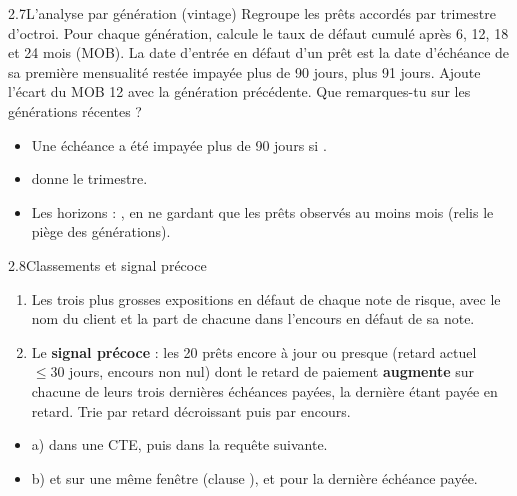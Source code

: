 \begin{exercice}{2.7}{L'analyse par génération (vintage)}
Regroupe les prêts accordés par trimestre d'octroi. Pour chaque génération, calcule le taux de défaut
cumulé après 6, 12, 18 et 24 mois (MOB). La date d'entrée en défaut d'un prêt est la date d'échéance de
sa première mensualité restée impayée plus de 90 jours, plus 91 jours. Ajoute l'écart du MOB 12 avec
la génération précédente. Que remarques-tu sur les générations récentes ?
\end{exercice}

\begin{indice}
\begin{itemize}
\item Une échéance a été impayée plus de 90 jours si
.
\item {} donne le trimestre.
\item Les horizons : , en ne gardant que
les prêts observés au moins  mois (relis le piège des générations).
\end{itemize}
\end{indice}

\begin{exercice}{2.8}{Classements et signal précoce}
\begin{enumerate}[label=\alph*)]
\item Les trois plus grosses expositions en défaut de chaque note de risque, avec le nom du client et
la part de chacune dans l'encours en défaut de sa note.
\item Le \textbf{signal précoce} : les 20 prêts encore à jour ou presque (retard actuel $\leq 30$ jours,
encours non nul) dont le retard de paiement \textbf{augmente} sur chacune de leurs trois dernières
échéances payées, la dernière étant payée en retard. Trie par retard décroissant puis par encours.
\end{enumerate}
\end{exercice}

\begin{indice}
\begin{itemize}
\item a)  dans une CTE, puis
 dans la requête suivante.
\item b)  et  sur une même fenêtre (clause ), et
 pour la dernière échéance
payée.
\end{itemize}
\end{indice}

